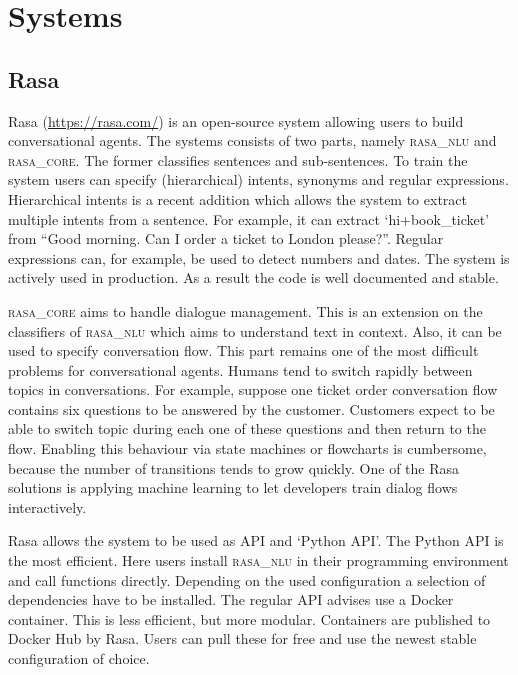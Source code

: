 \section{Systems}
\label{sec:systems}

\subsection{Rasa}
\label{subsec:rasa}
Rasa (\url{https://rasa.com/}) is an open-source system allowing users to build conversational agents.
The systems consists of two parts, namely \textsc{rasa\_nlu} and \textsc{rasa\_core}.
The former classifies sentences and sub-sentences.
To train the system users can specify (hierarchical) intents, synonyms and regular expressions.
Hierarchical intents is a recent addition which allows the system to extract multiple intents from a sentence.
For example, it can extract `hi+book\_ticket' from
``Good morning.
Can I order a ticket to London please?''.
Regular expressions can, for example, be used to detect numbers and dates.
The system is actively used in production.
As a result the code is well documented and stable.

\textsc{rasa\_core} aims to handle dialogue management.
This is an extension on the classifiers of \textsc{rasa\_nlu} which aims to understand text in context.
Also, it can be used to specify conversation flow.
This part remains one of the most difficult problems for conversational agents.
Humans tend to switch rapidly between topics in conversations.
For example, suppose one ticket order conversation flow contains six questions to be answered by the customer.
Customers expect to be able to switch topic during each one of these questions and then return to the flow.
Enabling this behaviour via state machines or flowcharts is cumbersome, because the number of transitions tends to grow quickly.
One of the Rasa solutions is applying machine learning to let developers train dialog flows interactively.

Rasa allows the system to be used as API and `Python API'.
The Python API is the most efficient.
Here users install \textsc{rasa\_nlu} in their programming environment and call functions directly.
Depending on the used configuration a selection of dependencies have to be installed.
The regular API advises use a Docker container.
This is less efficient, but more modular.
Containers are published to Docker Hub by Rasa.
Users can pull these for free and use the newest stable configuration of choice.

